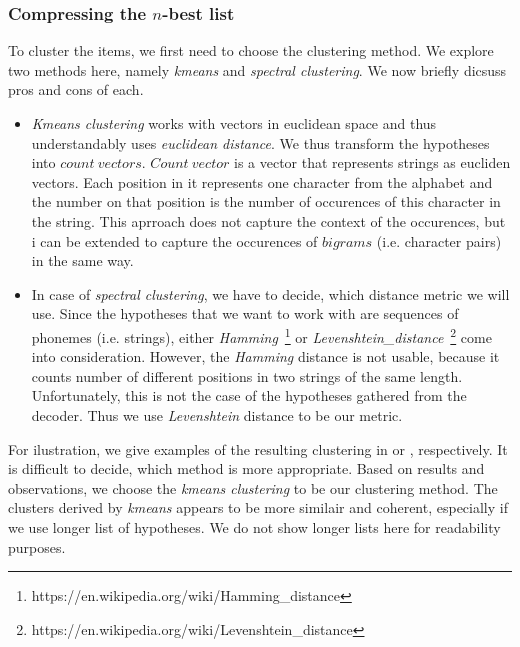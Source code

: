 \subsubsection{Compressing the $n$-best list}
\label{nbest-clust}
To cluster the items, we first need to choose the clustering method.
We explore two methods here, namely \textit{kmeans} and \textit{spectral clustering}.
We now briefly dicsuss pros and cons of each.
\begin{itemize}
\item \textit{Kmeans clustering} works with vectors in euclidean space and thus understandably uses \textit{euclidean distance}.
We thus transform the hypotheses into $count\: vectors$.
$Count\:vector$ is a vector that represents strings as eucliden vectors.
Each position in it represents one character from the alphabet and the number on that position is the number of occurences of this character in the string.
This aprroach does not capture the context of the occurences, but i can be extended to capture the occurences of $bigrams$ (i.e. character pairs) in the same way.
\item In case of \textit{spectral clustering}, we have to decide, which distance metric we will use.
Since the hypotheses that we want to work with are sequences of phonemes (i.e. strings), either \textit{Hamming}~\footnote{https://en.wikipedia.org/wiki/Hamming\_distance} or \textit{Levenshtein\_distance}~\footnote{https://en.wikipedia.org/wiki/Levenshtein\_distance} come into consideration.
However, the \textit{Hamming} distance is not usable, because it counts number of different positions in two strings of the same length.
Unfortunately, this is not the case of the hypotheses gathered from the decoder.
Thus we use \textit{Levenshtein} distance to be our metric.
\end{itemize}
\par
For ilustration, we give examples of the resulting clustering in  or , respectively.
It is difficult to decide, which method is more appropriate.
Based on results and observations, we choose the \textit{kmeans clustering} to be our clustering method.
The clusters derived by \textit{kmeans} appears to be more similair and coherent, especially if we use longer list of hypotheses.
We do not show longer lists here for readability purposes.
